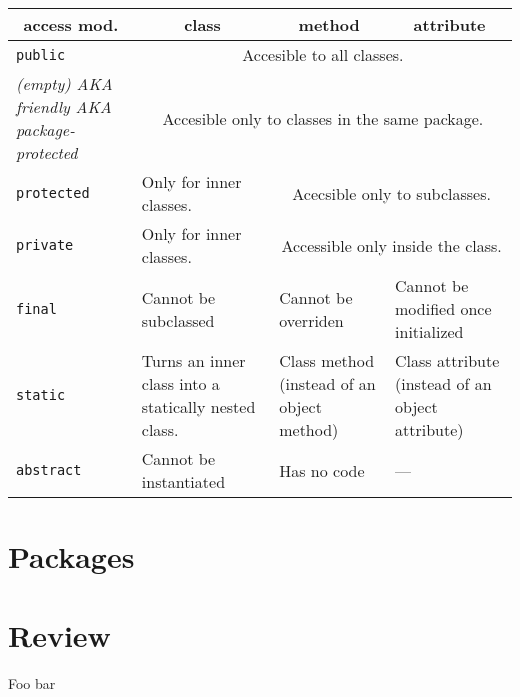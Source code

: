 \documentclass[a4paper, 9pt]{extarticle}
\begin{document}
\begin{center}
  \begin{tabular}{|p{3cm}|p{4cm}|p{4cm}|p{4cm}|}
\hline
\multicolumn{1}{|c|}{access mod.} & \multicolumn{1}{|c|}{class} & \multicolumn{1}{|c|}{method} & \multicolumn{1}{|c|}{attribute} \\
\hline
\texttt{public}    & \multicolumn{3}{|c|}{Accesible to all classes.} \\
\hline
\textsl{(empty) AKA friendly AKA package-protected} & \multicolumn{3}{|c|}{Accesible only to classes in the same package.} \\
\hline
\texttt{protected}   & Only for inner classes. & \multicolumn{2}{|c|}{Acecsible only to subclasses.} \\
\hline
\texttt{private}     & Only for inner classes. & \multicolumn{2}{|c|}{Accessible only inside the class.} \\
\hline
\hline
\texttt{final}       & Cannot be subclassed & Cannot be overriden & Cannot be modified once initialized \\
\hline
\texttt{static}      & Turns an inner class into a statically nested class. & Class method (instead of an object method) & Class attribute (instead of an object attribute) \\
\hline
\texttt{abstract}    & Cannot be instantiated & Has no code & --- \\
\hline
\end{tabular}
\end{center}

\section{Packages}

\section{Review}

\begin{blackboard}
Foo bar
\end{blackboard}
\end{document}
